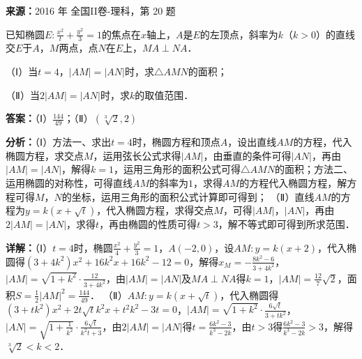 \begin{question}[points=12]
\textbf{来源：}2016 年 全国II卷-理科，第 20 题\par
已知椭圆$E:\frac{x^2}{t}+\frac{y^2}{3}=1$的焦点在$x$轴上，$A$是$E$的左顶点，斜率为$k$（$k>0$）的直线交$E$于$A$，$M$两点，点$N$在$E$上，$MA\perp NA$．

（Ⅰ）当$t=4$，$|AM|=|AN|$时，求$\triangle AMN$的面积；

（Ⅱ）当$2|AM|=|AN|$时，求$k$的取值范围．
\begin{solution}
\textbf{答案：}（Ⅰ）$\frac{144}{49}$；（Ⅱ）$(\sqrt[3]{2},2)$

\textbf{分析：}（Ⅰ）方法一、求出$t=4$时，椭圆方程和顶点$A$，设出直线$AM$的方程，代入椭圆方程，求交点$M$，运用弦长公式求得$|AM|$，由垂直的条件可得$|AN|$，再由$|AM|=|AN|$，解得$k=1$，运用三角形的面积公式可得$\triangle AMN$的面积；方法二、运用椭圆的对称性，可得直线$AM$的斜率为$1$，求得$AM$的方程代入椭圆方程，解方程可得$M$，$N$的坐标，运用三角形的面积公式计算即可得到；
（Ⅱ）直线$AM$的方程为$y=k(x+\sqrt{t})$，代入椭圆方程，求得交点$M$，可得$|AM|$，$|AN|$，再由$2|AM|=|AN|$，求得$t$，再由椭圆的性质可得$t>3$，解不等式即可得到所求范围．

\textbf{详解：}（Ⅰ）$t=4$时，椭圆$\frac{x^2}{4}+\frac{y^2}{3}=1$，$A(-2,0)$，设$AM:y=k(x+2)$，代入椭圆得$(3+4k^2)x^2+16k^2x+16k^2-12=0$，解得$x_M=-\frac{8k^2-6}{3+4k^2}$，$|AM|=\sqrt{1+k^2}\cdot\frac{12}{3+4k^2}$，由$|AM|=|AN|$及$MA\perp NA$得$k=1$，$|AM|=\frac{12}{7}\sqrt{2}$，面积$S=\frac12|AM|^2=\frac{144}{49}$．
（Ⅱ）$AM:y=k(x+\sqrt{t})$，代入椭圆得$(3+tk^2)x^2+2t\sqrt{t}k^2x+t^2k^2-3t=0$，$|AM|=\sqrt{1+k^2}\cdot\frac{6\sqrt{t}}{3+tk^2}$，$|AN|=\sqrt{1+\frac{1}{k^2}}\cdot\frac{6\sqrt{t}}{k^2t+3}$，由$2|AM|=|AN|$得$t=\frac{6k^2-3}{k^3-2k}$，由$t>3$得$\frac{6k^2-3}{k^3-2k}>3$，解得$\sqrt[3]{2}<k<2$．
\end{solution}
\end{question}

